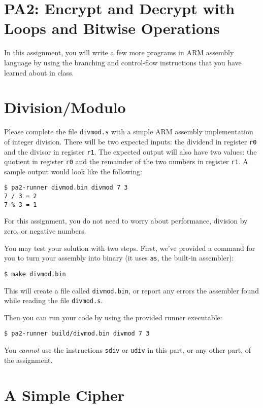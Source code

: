 \documentclass{article}
\def\r#1{\texttt{r#1}}
\begin{document}
\section{PA2: Encrypt and Decrypt with Loops and Bitwise Operations}

In this assignment, you will write a few more programs in ARM assembly 
language by using the branching and control-flow instructions that you 
have learned about in class. 

\section{Division/Modulo}

Please complete the file \texttt{divmod.s} with a simple ARM assembly
implementation of integer division. There will be two expected inputs: the
dividend in register \r{0} and the divisor in register \r{1}. The expected
output will also have two values: the quotient in register \r{0} and the
remainder of the two numbers in register \r{1}. A sample output would look like
the following:

\begin{verbatim}
$ pa2-runner divmod.bin divmod 7 3
7 / 3 = 2
7 % 3 = 1
\end{verbatim}

For this assignment, you do not need to worry about performance, division by
zero, or negative numbers.

You may test your solution with two steps. First, we've provided a command for
you to turn your assembly into binary (it uses {\tt as}, the built-in
assembler):

\begin{verbatim}
$ make divmod.bin
\end{verbatim}

This will create a file called {\tt divmod.bin}, or report any errors the
assembler found while reading the file {\tt divmod.s}.

Then you can run your code by using the provided runner executable:

\begin{verbatim}
$ pa2-runner build/divmod.bin divmod 7 3
\end{verbatim}

You \emph{cannot} use the instructions {\tt sdiv} or {\tt udiv} in this part,
or any other part, of the assignment.

\section{A Simple Cipher}
\end{document}
